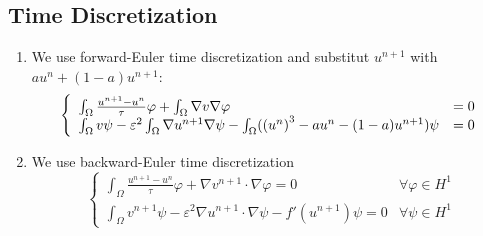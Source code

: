 \documentclass[cmbright]{mymmaauth}
\begin{document}
\subsection{Time Discretization}
\begin{enumerate}
\item  We use forward-Euler time discretization and  substitut $u^{n+1}$ with $a u^{n} + (1-a) u^{n+1}$:
\begin{equation} \left\{ \begin{array}{ll}
\int_\Omega \frac{u^{n+1} - u^{n}}{\tau} \varphi + \int_\Omega \nabla v \nabla \varphi & = 0 \\
\int_\Omega v \psi - \varepsilon^2 \int_\Omega \nabla u^{n+1} \nabla \psi - \int_\Omega(\left(u^{n}\right)^3 - a u^{n} - (1-a)u^{n+1}) \psi & = 0
\end{array} \right. \end{equation}
\item We use backward-Euler time discretization
\begin{equation} \left\{ \begin{array}{ll}
\int_\Omega{\frac{u^{n+1}-u^n}{\tau}}\varphi+\nabla v^{n+1}\cdot\nabla\varphi=0&\forall \varphi\in H^1\\
\int_\Omega v^{n+1}\psi-\varepsilon^2\nabla
u^{n+1}\cdot\nabla\psi-f'(u^{n+1})\psi=0&\forall \psi\in H^1
\end{array} \right. \end{equation}
\end{enumerate}



\end{document}
